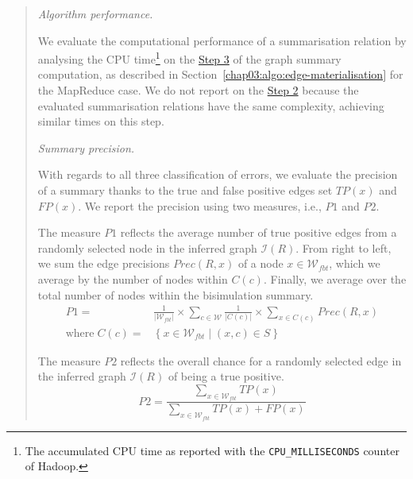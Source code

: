 \begin{quotation}
	\item[\emph{Algorithm performance.}]
	
	We evaluate the computational performance of a summarisation relation by analysing the CPU time\footnote{The accumulated CPU time as reported with the \texttt{CPU\_MILLISECONDS} counter of Hadoop.} on the \hyperref[step-he]{Step 3} of the graph summary computation, as described in Section~\ref{chap03:algo:edge-materialisation} for the MapReduce case. We do not report on the \hyperref[step-hn]{Step 2} because the evaluated summarisation relations have the same complexity, achieving similar times on this step.
	
	\item[\emph{Summary precision.}]
	
	With regards to all three classification of errors, we evaluate the precision of a summary thanks to the true and false positive edges set $TP(x)$ and $FP(x)$.
	We report the precision using two measures, i.e., $P1$ and $P2$.
	
	The measure $P1$ reflects the average number of true positive edges from a randomly selected node in the inferred graph $\mathcal{I}(R)$. From right to left, we sum the edge precisions $Prec(R, x)$ of a node $x\in \mathcal{W}_{fbt}$, which we average by the number of nodes within $C(c)$. Finally, we average over the total number of nodes within the bisimulation summary.
	$$
	\begin{aligned}
	P1 = & \frac{1}{\vert \mathcal{W}_{fbt} \vert} \times \sum_{c \in \mathcal{W}}{\frac{1}{\vert C(c) \vert} \times \sum_{x \in C(c)}{Prec(R, x)}} \\
	\text{where}\; C(c) = & \left\lbrace x \in \mathcal{W}_{fbt} \mid (x, c) \in S \right\rbrace
	\end{aligned}
	$$
	
	The measure $P2$ reflects the overall chance for a randomly selected edge in the inferred graph $\mathcal{I}(R)$ of being a true positive.
	$$
	P2 = \frac{\sum_{x \in \mathcal{W}_{fbt}}{TP(x)}}{\sum_{x \in \mathcal{W}_{fbt}}{TP(x) + FP(x)}}
	$$
\end{quotation}

